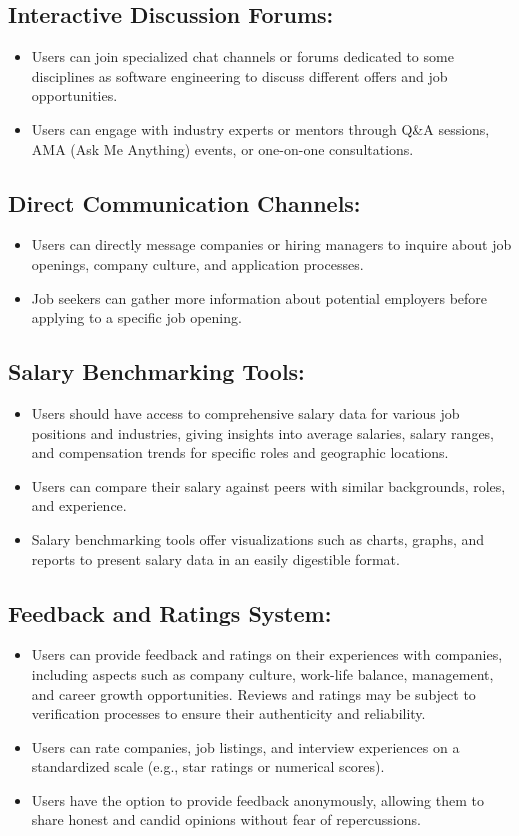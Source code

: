 \documentclass[titlepage]{article}
\begin{document}
\subsection{Interactive Discussion Forums:}
\begin{itemize}
    \item Users can join specialized chat channels or forums dedicated to some disciplines as software engineering to discuss different offers and job opportunities.
    \item Users can engage with industry experts or mentors through Q\&A sessions, AMA (Ask Me Anything) events, or one-on-one consultations.
\end{itemize}

\subsection{Direct Communication Channels:}
\begin{itemize}
    \item Users can directly message companies or hiring managers to inquire about job openings, company culture, and application processes.
    \item Job seekers can gather more information about potential employers before applying to a specific job opening.
\end{itemize}
\subsection{Salary Benchmarking Tools:}
\begin{itemize}
    \item Users should have access to comprehensive salary data for various job positions and industries, giving insights into average salaries, salary ranges, and compensation trends for specific roles and geographic locations.
    \item Users can compare their salary against peers with similar backgrounds, roles, and experience.
    \item Salary benchmarking tools offer visualizations such as charts, graphs, and reports to present salary data in an easily digestible format.
\end{itemize}

\subsection{Feedback and Ratings System:}
\begin{itemize}
    \item Users can provide feedback and ratings on their experiences with companies, including aspects such as company culture, work-life balance, management, and career growth opportunities. Reviews and ratings may be subject to verification processes to ensure their authenticity and reliability.
    \item Users can rate companies, job listings, and interview experiences on a standardized scale (e.g., star ratings or numerical scores).
    \item Users have the option to provide feedback anonymously, allowing them to share honest and candid opinions without fear of repercussions.
\end{itemize}
\end{document}

